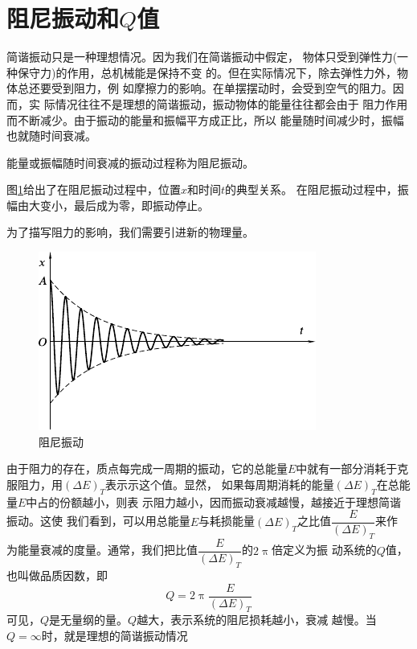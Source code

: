 \section{阻尼振动和$ Q $值}\label{sec:07.04}

简谐振动只是一种理想情况。因为我们在简谐振动中假定，
物体只受到弹性力(一种保守力)的作用，总机械能是保持不变
的。但在实际情况下，除去弹性力外，物体总还要受到阻力，例
如摩擦力的影响。在单摆摆动时，会受到空气的阻力。因而，实
际情况往往不是理想的简谐振动，振动物体的能量往往都会由于
阻力作用而不断减少。由于振动的能量和振幅平方成正比，所以
能量随时间减少时，振幅也就随时间衰减。

能量或振幅随时间衰减的振动过程称为阻尼振动。

图\ref{fig:07.08}给出了在阻尼振动过程中，位置$ x $和时间$ t $的典型关系。
在阻尼振动过程中，振幅由大变小，最后成为零，即振动停止。

为了描写阻力的影响，我们需要引进新的物理量。



\begin{figure}[t]
  \centering
  \includegraphics{figure/fig07.08}

  \caption{阻尼振动}
  \label{fig:07.08}
\end{figure}


由于阻力的存在，质点每完成一周期的振动，它的总能量$ E $中就有一部分消耗于克服阻力，用$ \left( \Delta E \right) _ { T } $表示示这个值。显然，
如果每周期消耗的能量$ \left( \Delta E \right) _ { T } $在总能量$ E $中占的份额越小，则表
示阻力越小，因而振动衰减越慢，越接近于理想简谐振动。这使
我们看到，可以用总能量$ E $与耗损能量$ \left( \Delta E \right) _ { T } $之比值$ \dfrac { E } { \left( \Delta E \right) _ { T } } $来作
为能量衰减的度量。通常，我们把比值$ \dfrac { E } { \left( \Delta E \right) _ { T } } $的$ 2 \uppi $倍定义为振
动系统的$ Q $值，也叫做品质因数，即
\begin{equation}\label{eqn:07.04.01}
  Q = 2 \uppi \frac { E } { \left( \Delta E \right) _ { T } }
\end{equation}
可见，$ Q $是无量纲的量。$ Q $越大，表示系统的阻尼损耗越小，衰减
越慢。当$ Q = \infty $时，就是理想的简谐振动情况

